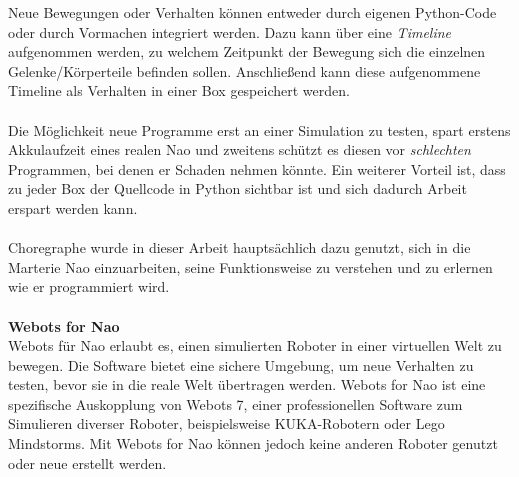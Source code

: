 Neue Bewegungen oder Verhalten können entweder durch eigenen Python-Code oder durch Vormachen integriert werden. Dazu kann über eine \textit{Timeline} aufgenommen werden, zu welchem Zeitpunkt der Bewegung sich die einzelnen Gelenke/Körperteile befinden sollen. Anschließend kann diese aufgenommene Timeline als Verhalten in einer Box gespeichert werden.
\\
\\
Die Möglichkeit neue Programme erst an einer Simulation zu testen, spart erstens Akkulaufzeit eines realen Nao und zweitens schützt es diesen vor \textit{schlechten} Programmen, bei denen er Schaden nehmen könnte. Ein weiterer Vorteil ist, dass zu jeder Box der Quellcode in Python sichtbar ist und sich dadurch Arbeit erspart werden kann.
\\
\\
Choregraphe wurde in dieser Arbeit hauptsächlich dazu genutzt, sich in die Marterie Nao einzuarbeiten, seine Funktionsweise zu verstehen und zu erlernen wie er programmiert wird.
\\
\\
\textbf{Webots for Nao}
\\
Webots für Nao erlaubt es, einen simulierten Roboter in einer virtuellen Welt zu bewegen. Die Software bietet eine sichere Umgebung, um neue Verhalten zu testen, bevor sie in die reale Welt übertragen werden. Webots for Nao ist eine spezifische Auskopplung von Webots 7, einer professionellen Software zum Simulieren diverser Roboter, beispielsweise KUKA-Robotern oder Lego Mindstorms. Mit Webots for Nao können jedoch keine anderen Roboter genutzt oder neue erstellt werden.

